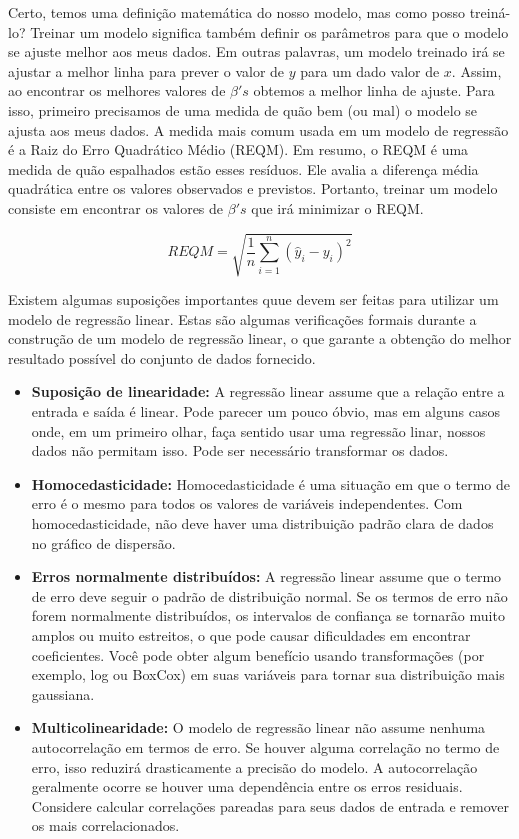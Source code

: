 \documentclass[
  letterpaper,
  DIV=11,
  numbers=noendperiod]{scrreprt}
\begin{document}
Certo, temos uma definição matemática do nosso modelo, mas como posso
treiná-lo? Treinar um modelo significa também definir os parâmetros para
que o modelo se ajuste melhor aos meus dados. Em outras palavras, um
modelo treinado irá se ajustar a melhor linha para prever o valor de
\(y\) para um dado valor de \(x\). Assim, ao encontrar os melhores
valores de \(\beta 's\) obtemos a melhor linha de ajuste. Para isso,
primeiro precisamos de uma medida de quão bem (ou mal) o modelo se
ajusta aos meus dados. A medida mais comum usada em um modelo de
regressão é a Raiz do Erro Quadrático Médio (REQM). Em resumo, o REQM é
uma medida de quão espalhados estão esses resíduos. Ele avalia a
diferença média quadrática entre os valores observados e previstos.
Portanto, treinar um modelo consiste em encontrar os valores de
\(\beta's\) que irá minimizar o REQM.

\[
REQM = \sqrt{\frac{1}{n}\sum_{i = 1}^{n}  (\hat y_i - y_i)^2}
\]

Existem algumas suposições importantes quue devem ser feitas para
utilizar um modelo de regressão linear. Estas são algumas verificações
formais durante a construção de um modelo de regressão linear, o que
garante a obtenção do melhor resultado possível do conjunto de dados
fornecido.

\begin{itemize}
\item
  \textbf{Suposição de linearidade:} A regressão linear assume que a
  relação entre a entrada e saída é linear. Pode parecer um pouco óbvio,
  mas em alguns casos onde, em um primeiro olhar, faça sentido usar uma
  regressão linar, nossos dados não permitam isso. Pode ser necessário
  transformar os dados.
\item
  \textbf{Homocedasticidade:} Homocedasticidade é uma situação em que o
  termo de erro é o mesmo para todos os valores de variáveis
  \hspace{0pt}\hspace{0pt}independentes. Com homocedasticidade, não deve
  haver uma distribuição padrão clara de dados no gráfico de dispersão.
\item
  \textbf{Erros normalmente distribuídos:} A regressão linear assume que
  o termo de erro deve seguir o padrão de distribuição normal. Se os
  termos de erro não forem normalmente distribuídos, os intervalos de
  confiança se tornarão muito amplos ou muito estreitos, o que pode
  causar dificuldades em encontrar coeficientes. Você pode obter algum
  benefício usando transformações (por exemplo, log ou BoxCox) em suas
  variáveis \hspace{0pt}\hspace{0pt}para tornar sua distribuição mais
  gaussiana.
\item
  \textbf{Multicolinearidade:} O modelo de regressão linear não assume
  nenhuma autocorrelação em termos de erro. Se houver alguma correlação
  no termo de erro, isso reduzirá drasticamente a precisão do modelo. A
  autocorrelação geralmente ocorre se houver uma dependência entre os
  erros residuais. Considere calcular correlações pareadas para seus
  dados de entrada e remover os mais correlacionados.
\end{itemize}
\end{document}
